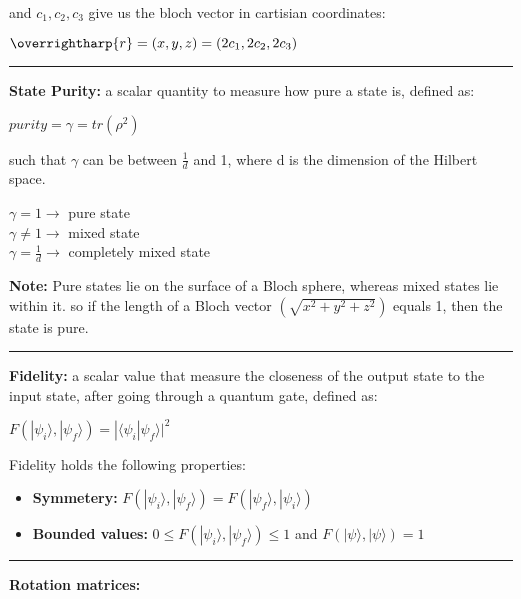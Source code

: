 \documentclass{article}
\begin{document}
and  $c_{1}, c_{2}, c_{3}$ give us the bloch vector in cartisian coordinates:
\begin{center}
$\overrightharp{r} = (x, y, z) = (2c_{1}, 2c_{2}, 2c_{3})$
\end{center}


\vspace{5pt}
\hrule 
\vspace{5pt}


\textbf{State Purity:} a scalar quantity to measure how pure a state is, defined as:

\begin{center}
$ purity = \gamma = tr(\rho^2) $
\end{center}

such that $\gamma$ can be between $\frac{1}{d}$ and 1, where d is the dimension of the Hilbert space.

\begin{center}
$\gamma = 1 \rightarrow $ pure state \\
$\gamma \ne 1 \rightarrow $ mixed state \\
$\gamma = \frac{1}{d} \rightarrow $  completely mixed state
\end{center}

\textbf{Note:} Pure states lie on the surface of a Bloch sphere, whereas mixed states lie within it. 
so if the length of a Bloch vector $(\sqrt{x^2 + y^2 + z^2} )$ equals 1, then the state is pure. 

 
\vspace{5pt}
\hrule 
\vspace{5pt}


\newpage

\textbf{Fidelity:} a scalar value that measure the closeness of the output state to the input state, after going through a quantum gate, defined as:

\begin{center}

$ F(|\psi_{i}\rangle, |\psi_{f}\rangle) = | \langle \psi_{i} | \psi_{f}\rangle | ^2 $ 

\end{center}

Fidelity holds the following properties:

\begin{itemize}
	\item \textbf{Symmetery:}  $ F(|\psi_{i}\rangle, |\psi_{f}\rangle) = F( |\psi_{f}\rangle, |\psi_{i}\rangle ) $
	\item \textbf{Bounded values:}  $ 0 \le F(|\psi_{i}\rangle, |\psi_{f}\rangle) \le 1$ and $ F(|\psi\rangle,|\psi\rangle) = 1 $
\end{itemize}

\vspace{5pt}
\hrule 
\vspace{5pt}


\textbf{Rotation matrices:} 
\end{document}
